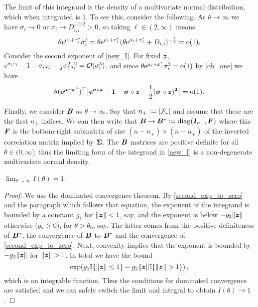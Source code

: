 The limit of this integrand is the density of a multivariate normal
distribution, which when integrated is 1. To see this, consider the
following. As $\theta \to \infty$ we have $\sigma_i \to 0$ or $\sigma_i
\to D_{i,i}^{-1/2} > 0$, so taking $\ell \in (2,\infty)$ means
\begin{equation} \label{oh_one}
	\theta \mathrm{e}^{\mu_i + x_i^*} \sigma_i^\ell = \theta \mathrm{e}^{\mu_i + x_i^*}
  (\theta \mathrm{e}^{\mu_i + x_i^*} + D_{i,i})^{-\frac{\ell}{2}} = {\mathrm{o}}(1) .
\end{equation}
Consider the second exponent of \eqref{new_I}. For fixed $\bm{z}$,
$\mathrm{e}^{\sigma_i z_i} - 1 - \sigma_i z_i - \frac12 \sigma_i^2 z_i^2 =
{\mathcal{O}}(\sigma_i^3)$, and since $\theta \mathrm{e}^{\mu_i + x_i^*} \sigma_i^3 = {\mathrm{o}}(1)$
by \eqref{oh_one} we have
\begin{equation} \label{second_exp_to_zero}
	\theta (\text{\bf{e}}^{\bm{\mu} + \bm{x}^*})^\top  \bigl[ \text{\bf{e}}^{\bm{\sigma} \circ \bm{z}} - \bm{1} - \bm{\sigma} \circ \bm{z} - \frac12(\bm{\sigma} \circ \bm{z})^{\bm{2}} \bigr] = {\mathrm{o}}(1) .
\end{equation}

Finally, we consider $\bm{B}$ as $\theta \to \infty$. Say that $n_{+} \defeq
\abs{\Fset{+}}$ and assume that these are the first $n_{+}$ indices. We can then
write that $\bm{B} \to \bm{B}^* := \mathrm{diag}(\bm{I}_{n_{+}}, \bm{F})$ where this
$\bm{F}$ is the bottom-right submatrix of size $(n-n_{+}) \times (n-n_{+})$ of
the inverted correlation matrix implied by $\bm{\Sigma}$. The $\bm{B}$ matrices are
positive definite for all $\theta\in(0,\infty]$; thus the limiting form of the
  integrand in \eqref{new_I} is a non-degenerate multivariate normal density.

\begin{proposition} $\lim_{\theta \to \infty} I(\theta) = 1$.
\end{proposition}

\begin{proof}
We use the dominated convergence theorem. By \eqref{second_exp_to_zero} and
the paragraph which follows that equation, the exponent of the integrand is
bounded by a constant $g_1$ for $\lVert \bm{z}\rVert < 1$, say, and the exponent is
below $-g_2 \lVert \bm{z}\rVert$ otherwise ($g_2 > 0$), for $\theta > \theta_0$, say. The
latter comes from the positive definiteness of $\bm{B}^*$, the convergence of
$\bm{B}$ to $\bm{B}^*$ and the convergence of \eqref{second_exp_to_zero}. Next,
convexity implies that the exponent is bounded by $-g_2\lVert \bm{z}\rVert$ for $\lVert \bm{z}\rVert
> 1$. In total we have the bound
%
\[ \exp( g_1 \mathbb{I}\{ \lVert \bm{z}\rVert \leq 1 \} - g_2 \lVert \bm{z}\rVert \mathbb{I}\{ \lVert \bm{z}\rVert > 1 \} ) \,, \]
%
which is an integrable function. Thus the conditions for dominated convergence
are satisfied and we can safely switch the limit and integral to obtain
$I(\theta) \to 1$.
\end{proof}


